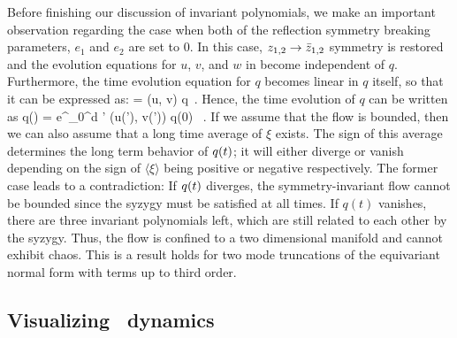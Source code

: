 Before finishing our discussion of invariant polynomials, we make an
important observation regarding the case when both of the reflection symmetry breaking
parameters, $e_{1}$ and $e_2$ are set to $0$. In this case, $z_{1,2} \rightarrow \bar{z}_{1,2}$
symmetry is restored and the evolution equations for $u$, $v$, and $w$ in  become
independent of $q$. Furthermore, the time evolution equation for $q$ becomes linear in $q$ itself, so that
it can be expressed as:
\beq
     = \xi (u, v) q \,.
Hence, the time evolution of $q$ can be written as
\beq
    q(\zeit) =  e^{\int_0^\zeit d \zeit' \xi (u(\zeit'), v(\zeit'))} q(0) \, .
If we assume that the flow is bounded, then we can also assume that a long time
average of $\xi$ exists. The sign of this average determines the long term
behavior of $q(t)$; it will either diverge or vanish depending on the sign of
$\langle \xi \rangle$ being positive or negative respectively. The former case
leads to a contradiction: If $q(t)$ diverges, the symmetry-invariant flow cannot
be bounded since the syzygy  must be satisfied at all times. If
$q(t)$ vanishes, there are three invariant polynomials left, which are still
related to each other by the syzygy. Thus, the flow is confined
to a two dimensional manifold and cannot exhibit chaos. This is a result holds
for two mode truncations of the equivariant normal form with terms up to third order.

\subsection{Visualizing \twomode\ dynamics}
\label{s:visual}

